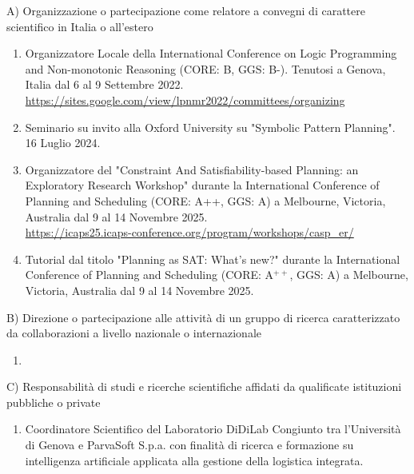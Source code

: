 \documentclass{resume} %
\begin{document}

\begin{rSectionLower}{A) Organizzazione o partecipazione come relatore a convegni di carattere scientifico in Italia o all'estero}
	\begin{enumerate}
		\item Organizzatore Locale della International Conference on Logic Programming and Non-monotonic Reasoning (CORE: B, GGS: B-). Tenutosi a Genova, Italia dal 6 al 9 Settembre 2022. \\\url{https://sites.google.com/view/lpnmr2022/committees/organizing}
		\item Seminario su invito alla Oxford University su "Symbolic Pattern Planning". 16 Luglio 2024.
		\item Organizzatore del "Constraint And Satisfiability-based Planning: an Exploratory Research Workshop" durante la International Conference of Planning and Scheduling (CORE: A++, GGS: A) a Melbourne, Victoria, Australia dal 9 al 14 Novembre 2025. \\\url{https://icaps25.icaps-conference.org/program/workshops/casp_er/}
		\item Tutorial dal titolo "Planning as SAT: What’s new?" durante la International Conference of Planning and Scheduling (CORE: A$^{++}$, GGS: A) a Melbourne, Victoria, Australia dal 9 al 14 Novembre 2025.
	\end{enumerate}
\end{rSectionLower}

\begin{rSectionLower}{B) Direzione o partecipazione alle attività di un gruppo di ricerca caratterizzato da collaborazioni a livello nazionale o internazionale}
	\begin{enumerate}
		\item 
	\end{enumerate}
\end{rSectionLower}

\begin{rSectionLower}{C) Responsabilità di studi e ricerche scientifiche affidati da qualificate istituzioni pubbliche o private}
	\begin{enumerate}
		\item Coordinatore Scientifico del Laboratorio DiDiLab Congiunto tra l'Università di Genova e ParvaSoft S.p.a. con finalità di ricerca e formazione su intelligenza artificiale applicata alla gestione della logistica integrata.	
	\end{enumerate}
\end{rSectionLower}
\end{document}
